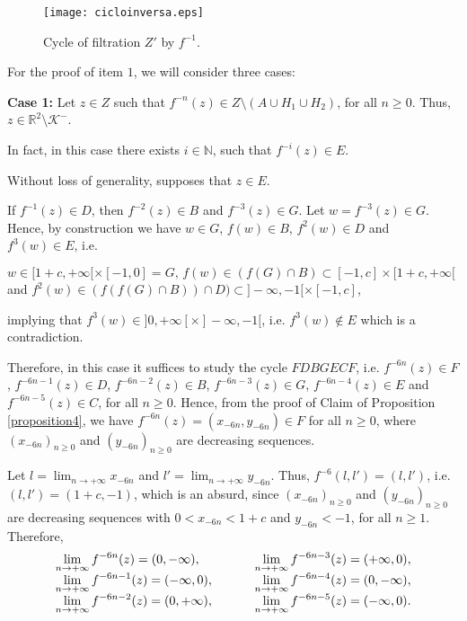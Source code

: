 \documentclass[11pt]{amsart}
\theoremstyle{definition}
\begin{document}
\begin{figure}[!h]
	\centering
	\texttt{[image: cicloinversa.eps]}
	\caption{Cycle of filtration $Z'$ by $f^{-1}$.}
	\label{cicloinversa}
\end{figure}


For the proof of item $1$, we will consider three cases:

\noindent \textbf{Case 1:} Let $z\in Z$ such that $f^{-n}(z)\in Z\setminus
(A\cup H_1\cup H_2)$, for all $n\geq 0$. Thus, $z\in
\mathbb{R}^2\setminus \mathcal{K}^-$.

In fact, in this case there exists $i\in\mathbb{N}$, such that $f^{-i}(z)\in
E$.

Without loss of generality, supposes that $z\in E$.

If $f^{-1}(z)\in D$, then $f^{-2}(z)\in B$ and $f^{-3}(z)\in G$. Let
$w=f^{-3}(z)\in G$. Hence, by construction we have $w\in G$,
$f(w)\in B$, $f^2(w)\in D$ and $f^3(w)\in E$, i.e.

\begin{center}
	$w \in [1+c,+\infty[\times[-1,0]=G \textrm{, }  f(w)\in
	(f(G)\cap B)\subset [-1,c]\times[1+c,+\infty[$  and
	$f^2(w)\in (f(f(G)\cap B))\cap D)\subset ]-\infty,-1[\times[-1,c]$,
\end{center}


\noindent implying that $f^3(w)\in ]0,+\infty[\times]-\infty,-1[$, i.e. $f^3(w)\notin E$ which is a contradiction.

Therefore, in this case it suffices to study the cycle $FDBGECF$, i.e. $f^{-6n}(z)\in F$,
$f^{-6n-1}(z)\in D$, $f^{-6n-2}(z)\in B$,  $f^{-6n-3}(z)\in G$,
$f^{-6n-4}(z)\in E$ and $f^{-6n-5}(z)\in C$, for all $n\geq 0$. Hence, from the proof of Claim of Proposition \ref{proposition4}, we have
$f^{-6n}(z)=(x_{-6n},y_{-6n})\in F$ for all $n\geq 0$, where
$(x_{-6n})_{n\geq 0}$ and $(y_{-6n})_{n\geq 0}$ are decreasing sequences.

Let $l=\displaystyle\lim_{n\to +\infty}x_{-6n}$ and
$l'=\displaystyle\lim_{n\to +\infty}y_{-6n}$. Thus,
$f^{-6}(l,l')=(l,l')$, i.e. $(l,l')=(1+c,-1)$, which is an absurd, since $(x_{-6n})_{n\geq 0}$ and $(y_{-6n})_{n\geq 0}$ are
decreasing sequences with $0<x_{-6n}<1+c$ and $y_{-6n}<-1$, for all $n\geq 1$. Therefore,
$$
\begin{array}{lcl}
\displaystyle\lim_{n\to +\infty}f^{-6n}(z)=(0,-\infty), & \hspace{.5cm} & \displaystyle\lim_{n\to +\infty}f^{-6n-3}(z)=(+\infty,0), \\
\displaystyle\lim_{n\to +\infty}f^{-6n-1}(z)=(-\infty,0), & \hspace{.5cm} & \displaystyle\lim_{n\to +\infty}f^{-6n-4}(z)=(0,-\infty), \\
\displaystyle\lim_{n\to +\infty}f^{-6n-2}(z)=(0,+\infty), & \hspace{.5cm} & \displaystyle\lim_{n\to +\infty}f^{-6n-5}(z)=(-\infty,0). \\
\end{array}
$$
\end{document}
